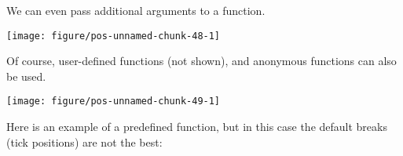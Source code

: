 \documentclass[paper=a4,10pt,div=17,headsepline,BCOR=12mm,twoside,open=right]{scrbook}\usepackage{knitr}
\begin{document}
We can even pass additional arguments to a function.

\begin{knitrout}\footnotesize
{}\color{fgcolor}\begin{kframe}
\begin{alltt}
\hlstd{(}\hlstd{(}\hlstd{=}\hlopt{-}\hlopt{:}\hlstd{),} \hlstd{(} \hlopt{+}
  \hlstd{(}   \hlstd{=} \hlstd{(} \hlstd{=} \hlstd{,}  \hlstd{=} \hlstd{))}
\end{alltt}
\end{kframe}

{\centering \texttt{[image: figure/pos-unnamed-chunk-48-1]} 

}



\end{knitrout}

Of course, user-defined functions (not shown), and anonymous functions can also be used.

\begin{knitrout}\footnotesize
{}\color{fgcolor}\begin{kframe}
\begin{alltt}
\hlstd{(}\hlstd{(}\hlstd{=}\hlopt{:}\hlstd{),} \hlstd{(} \hlopt{+}
  \hlstd{(} \hlstd{=} \hlstd{(}\hlstd{,} \hlstd{,}  \hlopt{+}  \hlopt{*} \hlopt{^}\hlstd{\},}
                 \hlstd{=} \hlstd{(} \hlstd{=} \hlstd{,}  \hlstd{=} \hlstd{))}
\end{alltt}
\end{kframe}

{\centering \texttt{[image: figure/pos-unnamed-chunk-49-1]} 

}



\end{knitrout}

Here is an example of a predefined function, but in this case the default breaks (tick positions) are not the best:
\end{document}
